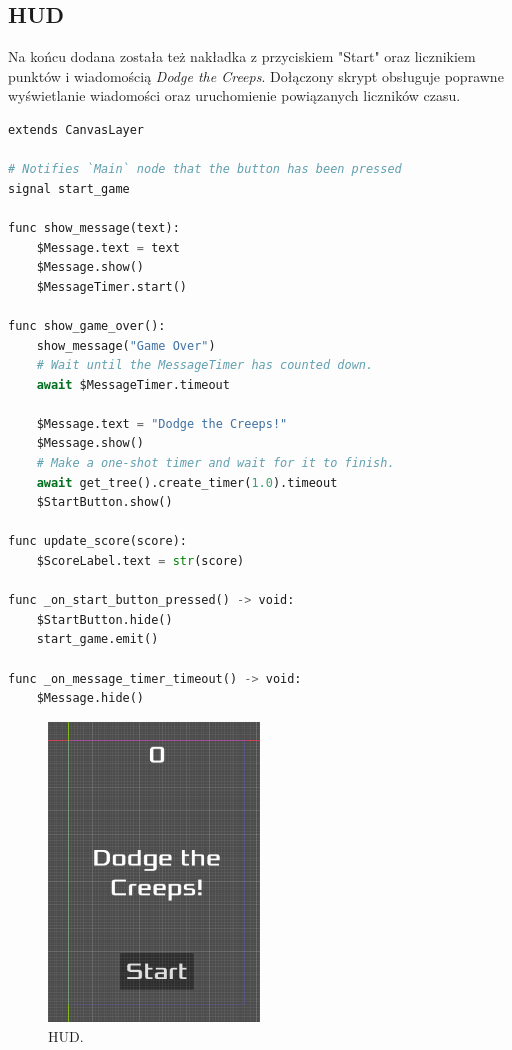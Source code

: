 \documentclass[a4paper,12pt]{article}
\begin{document}
\subsection{HUD}

Na końcu dodana została też nakładka z przyciskiem "Start" oraz licznikiem punktów i wiadomością \textit{Dodge the Creeps}. Dołączony skrypt obsługuje poprawne wyświetlanie wiadomości oraz uruchomienie powiązanych liczników czasu.

\begin{lstlisting}[language=Python]
extends CanvasLayer

# Notifies `Main` node that the button has been pressed
signal start_game

func show_message(text):
	$Message.text = text
	$Message.show()
	$MessageTimer.start()
	
func show_game_over():
	show_message("Game Over")
	# Wait until the MessageTimer has counted down.
	await $MessageTimer.timeout

	$Message.text = "Dodge the Creeps!"
	$Message.show()
	# Make a one-shot timer and wait for it to finish.
	await get_tree().create_timer(1.0).timeout
	$StartButton.show()
	
func update_score(score):
	$ScoreLabel.text = str(score)

func _on_start_button_pressed() -> void:
	$StartButton.hide()
	start_game.emit()

func _on_message_timer_timeout() -> void:
	$Message.hide()
\end{lstlisting}

\begin{figure}[h]
    \centering
    \includegraphics[width=0.5\textwidth]{HUD.png}
    \caption{HUD.}
    \label{fig:HUD1}
\end{figure}
\end{document}
